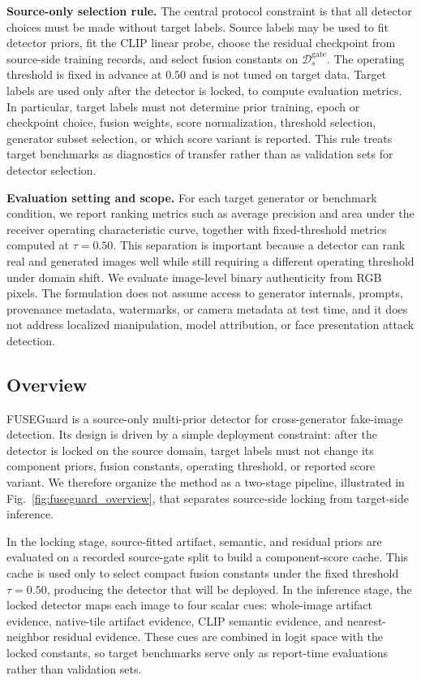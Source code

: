 \documentclass[lettersize,journal]{IEEEtran}
\begin{document}
\textbf{Source-only selection rule.}
The central protocol constraint is that all detector choices must be made without target labels. Source labels may be used to fit detector priors, fit the CLIP linear probe, choose the residual checkpoint from source-side training records, and select fusion constants on $\mathcal{D}_{s}^{\mathrm{gate}}$. The operating threshold is fixed in advance at $0.50$ and is not tuned on target data. Target labels are used only after the detector is locked, to compute evaluation metrics. In particular, target labels must not determine prior training, epoch or checkpoint choice, fusion weights, score normalization, threshold selection, generator subset selection, or which score variant is reported. This rule treats target benchmarks as diagnostics of transfer rather than as validation sets for detector selection.

\textbf{Evaluation setting and scope.}
For each target generator or benchmark condition, we report ranking metrics such as average precision and area under the receiver operating characteristic curve, together with fixed-threshold metrics computed at $\tau=0.50$. This separation is important because a detector can rank real and generated images well while still requiring a different operating threshold under domain shift. We evaluate image-level binary authenticity from RGB pixels. The formulation does not assume access to generator internals, prompts, provenance metadata, watermarks, or camera metadata at test time, and it does not address localized manipulation, model attribution, or face presentation attack detection.

\subsection{Overview}
\label{sec:method_overview}

FUSEGuard is a source-only multi-prior detector for cross-generator fake-image detection. Its design is driven by a simple deployment constraint: after the detector is locked on the source domain, target labels must not change its component priors, fusion constants, operating threshold, or reported score variant. We therefore organize the method as a two-stage pipeline, illustrated in Fig.~\ref{fig:fuseguard_overview}, that separates source-side locking from target-side inference.

In the locking stage, source-fitted artifact, semantic, and residual priors are evaluated on a recorded source-gate split to build a component-score cache. This cache is used only to select compact fusion constants under the fixed threshold $\tau=0.50$, producing the detector that will be deployed. In the inference stage, the locked detector maps each image to four scalar cues: whole-image artifact evidence, native-tile artifact evidence, CLIP semantic evidence, and nearest-neighbor residual evidence. These cues are combined in logit space with the locked constants, so target benchmarks serve only as report-time evaluations rather than validation sets.
\end{document}
